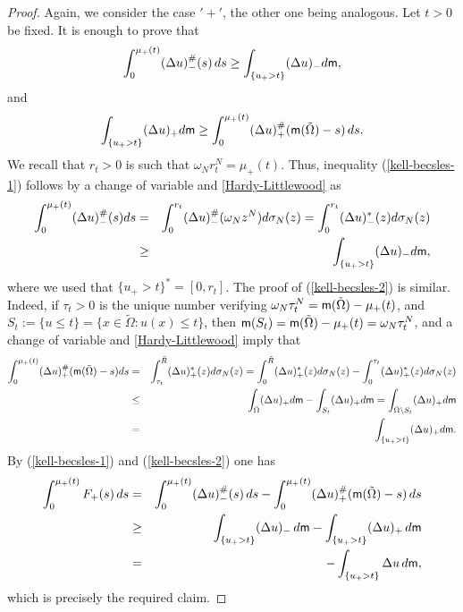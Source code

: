 \documentclass[11pt, reqno]{amsart}
\numberwithin{equation}{section}
\begin{document}
\begin{proof} Again, we consider the case $'+'$, the other one being analogous. 
Let $t>0$ be fixed. It is enough to prove that 
\begin{equation}\label{kell-becsles-1}
	\displaystyle\int_0^{\mu_+(t)} (\Delta  u)^\#_-(s)\, {\rm d}s\geq \int_{\{u_+>t \}}(\Delta  u)_-{\rm d}{\sf m},
\end{equation} 
and 
\begin{equation}\label{kell-becsles-2}
	\displaystyle\int_{\{u_+>t \}}(\Delta u)_+ {\rm d}{\sf m}\geq \int_0^{\mu_+(t)} (\Delta u)^\#_+({\sf m}(\tilde \Omega)-s)\, {\rm d}s.
\end{equation}
We recall that $r_t>0$ is such that $\omega_N r_t^N=\mu_+(t)$. Thus, inequality  (\ref{kell-becsles-1}) follows by a change of variable and \eqref{Hardy-Littlewood} as
\begin{eqnarray*}
	\displaystyle\int_0^{\mu_+(t)} (\Delta u)^\#_-(s){\rm d}s&=&\int_0^{ r_t} (\Delta u)^\#_-(\omega_N z^N){\rm d}\sigma_N (z)=\int_0^{r_t}(\Delta u)^*_-(z){\rm d} \sigma_N (z)\\&\geq & \int_{\{u_+>t \}}(\Delta u)_-{\rm d}{\sf m},
\end{eqnarray*}
where we used that   $\{u_+>t \}^*=[0,r_t]$. The proof of (\ref{kell-becsles-2}) is similar. Indeed, if $\tau_t>0$ is the unique  number verifying $\omega_N\tau_t^N={\sf m}(\tilde \Omega)-\mu_+(t)$, and $S_t:=\{u\leq t\}=\{x\in \tilde \Omega: u(x)\leq t\}$,  then ${\sf m}(S_t)={\sf m}(\tilde \Omega)-\mu_+(t)=\omega_N\tau_t^N$, and a change of variable and  \eqref{Hardy-Littlewood} imply  that 
\begin{eqnarray*}
	\int_0^{\mu_+(t)} (\Delta u)^\#_+({\sf m}(\tilde \Omega)-s){\rm d}s&=& \int_{\tau_t}^{\tilde R}(\Delta u)^*_+(z){\rm d} \sigma_N (z)=\int_{0}^{\tilde R}(\Delta u)^*_+(z){\rm d} \sigma_N (z)-\int_{0}^{\tau_t}(\Delta u)^*_+(z){\rm d} \sigma_N (z)\\&\leq  & \int_{\tilde \Omega}(\Delta u)_+{\rm d}{\sf m}-\int_{S_t}(\Delta u)_+{\rm d}{\sf m}=\int_{\tilde \Omega\setminus S_t}(\Delta u)_+{\rm d}{\sf m}\\&=&\int_{\{u_+>t \}}(\Delta u)_+ {\rm d}{\sf m}.
\end{eqnarray*}
By (\ref{kell-becsles-1}) and (\ref{kell-becsles-2}) one has 
\begin{eqnarray*}
	\int_0^{\mu_+(t)} F_+(s)\, {\rm d}s&=&\int_0^{\mu_+(t)} (\Delta u)^\#_-(s)\, {\rm d}s-\int_0^{\mu_+(t)}(\Delta u)^\#_+({\sf m}(\tilde \Omega)-s)\, {\rm d}s\\&\geq& 
	\int_{\{u_+>t \}}(\Delta  u)_- \, {\rm d}{\sf m}-\int_{\{u_+>t \}}(\Delta u)_+\,  {\rm d}{\sf m}\\
	&=&-\int_{\{u_+>t \}}\Delta u\, {\rm d}{\sf m},
\end{eqnarray*}
which is precisely the required claim. 
\end{proof}
\end{document}

